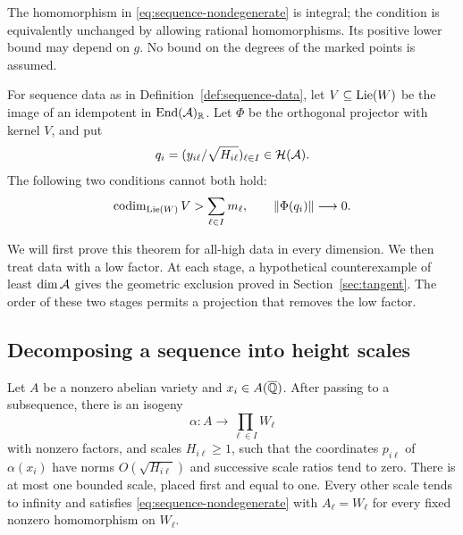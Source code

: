 The homomorphism in \eqref{eq:sequence-nondegenerate} is integral; the
condition is equivalently unchanged by allowing rational homomorphisms.
Its positive lower bound may depend on $g$. No bound on the degrees of
the marked points is assumed.

\begin{theorem}
\label{thm:sequence}
For sequence data as in Definition~\ref{def:sequence-data}, let
$V\subseteq\operatorname{Lie}(W)$ be the image of an idempotent in
$\operatorname{End}(\mathcal A)_{\mathbb R}$. Let $\Phi$ be the orthogonal projector with
kernel $V$, and put
\[
 q_i=(y_{i\ell}/\sqrt{H_{i\ell}})_{\ell\in I}
 \in\mathcal H(\mathcal A).
\]
The following two conditions cannot both hold:
\begin{equation}
 \label{eq:forbidden-sequence}
 \operatorname{codim}_{\operatorname{Lie}(W)}V>\sum_{\ell\in I}m_\ell,
 \qquad \|\Phi(q_i)\|\longrightarrow0.
\end{equation}
\end{theorem}

We will first prove this theorem for all-high data in every dimension.
We then treat data with a low factor. At each stage, a hypothetical
counterexample of least $\dim\mathcal A$ gives the geometric exclusion proved
in Section~\ref{sec:tangent}. The order of these two stages permits a
projection that removes the low factor.

\subsection{Decomposing a sequence into height scales}

\begin{lemma}
\label{lemma:height-decomposition}
Let $A$ be a nonzero abelian variety and $x_i\in A(\overline{\mathbb Q})$. After
passing to a subsequence, there is an isogeny
\[
 \alpha:A\longrightarrow\prod_{\ell\in I}W_\ell
\]
with nonzero factors, and scales $H_{i\ell}\ge1$, such that the
coordinates $p_{i\ell}$ of $\alpha(x_i)$ have norms
$O(\sqrt{H_{i\ell}})$ and successive scale ratios tend to zero.
There is at most one bounded scale, placed first and equal to one.
Every other scale tends to infinity and satisfies
\eqref{eq:sequence-nondegenerate} with $A_\ell=W_\ell$ for every
fixed nonzero homomorphism on $W_\ell$.
\end{lemma}

